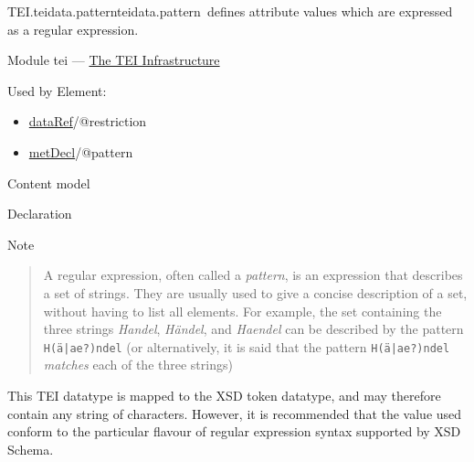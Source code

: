\begin{reflist}
\item[]\begin{specHead}{TEI.teidata.pattern}{teidata.pattern} defines attribute values which are expressed as a regular expression.\end{specHead} 
    \item[{Module}]
  tei — \hyperref[ST]{The TEI Infrastructure}
    \item[{Used by}]
  Element: \begin{itemize}
\item \hyperref[TEI.dataRef]{dataRef}/@restriction
\item \hyperref[TEI.metDecl]{metDecl}/@pattern
\end{itemize} 
    \item[{Content model}]
    \item[{Declaration}]
    \item[{Note}]
  \par

\begin{quote}
 A regular expression, often called a \textit{pattern}, is an expression that describes a set of strings. They are usually used to give a concise description of a set, without having to list all elements. For example, the set containing the three strings \textit{Handel}, \textit{Händel}, and \textit{Haendel} can be described by the pattern \texttt{H(ä|ae?)ndel} (or alternatively, it is said that the pattern \texttt{H(ä|ae?)ndel} \textit{matches} each of the three strings)\par

\end{quote}
\par
This TEI datatype is mapped to the XSD token datatype, and may therefore contain any string of characters. However, it is recommended that the value used conform to the particular flavour of regular expression syntax supported by XSD Schema. 
\end{reflist}  

